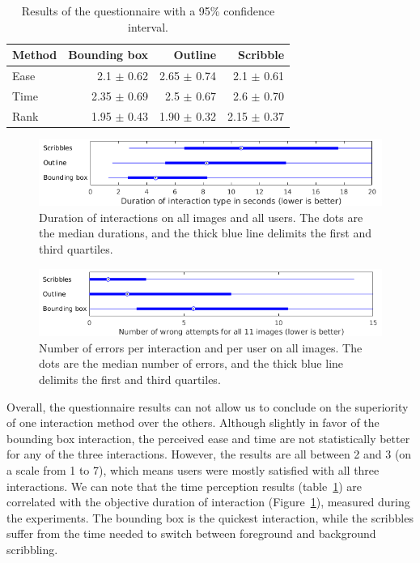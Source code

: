 \begin{table}[ht]
\centering
\begin{tabular}{lrrr}
Method & Bounding box & Outline & Scribble \\ \midrule
Ease & 2.1 $\pm$ 0.62 & 2.65 $\pm$ 0.74 & 2.1 $\pm$ 0.61 \\
Time & 2.35 $\pm$ 0.69 & 2.5 $\pm$ 0.67 & 2.6 $\pm$ 0.70 \\
Rank & 1.95 $\pm$ 0.43 & 1.90 $\pm$ 0.32 & 2.15 $\pm$ 0.37 \\
\end{tabular}
\caption{Results of the questionnaire with a 95\% confidence interval.}%
\label{tab:questionnaire}
\end{table}


\begin{figure}[ht]
\includegraphics[width=\columnwidth]{assets/plot/interactions_durations.png}
\caption{Duration of interactions on all images and all users.
The dots are the median durations, and the thick blue line delimits
the first and third quartiles.}%
\label{fig:timeinteraction}
\end{figure}


\begin{figure}[ht]
\includegraphics[width=\columnwidth]{assets/plot/interactions_errors_per_user.png}
\caption{Number of errors per interaction and per user on all images.
The dots are the median number of errors,
and the thick blue line delimits the first and third quartiles.}%
\label{fig:errorinteraction}
\end{figure}


Overall, the questionnaire results can not allow us to conclude
on the superiority of one interaction method over the others.
Although slightly in favor of the bounding box interaction,
the perceived ease and time are not statistically better
for any of the three interactions.
However, the results are all between 2 and 3 (on a scale from 1 to 7),
which means users were mostly satisfied with all three interactions.
We can note that the time perception results
(table~\ref{tab:questionnaire}) are correlated with the
objective duration of interaction (Figure~\ref{fig:timeinteraction}),
measured during the experiments.
The bounding box is the quickest interaction,
while the scribbles suffer from the time needed to switch between
foreground and background scribbling.


